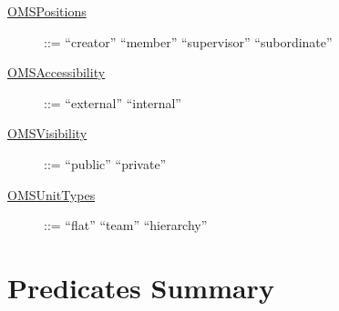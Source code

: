 \begin{description}
\item[\underline{OMSPositions}] ::= ``creator'' \textbar ``member'' \textbar ``supervisor'' \textbar ``subordinate'' 

\item[\underline{OMSAccessibility}] ::= ``external'' \textbar ``internal''

\item[\underline{OMSVisibility}] ::= ``public'' \textbar ``private''

\item[\underline{OMSUnitTypes}] ::= ``flat'' \textbar ``team'' \textbar ``hierarchy''

\end{description}
\section{Predicates Summary}

